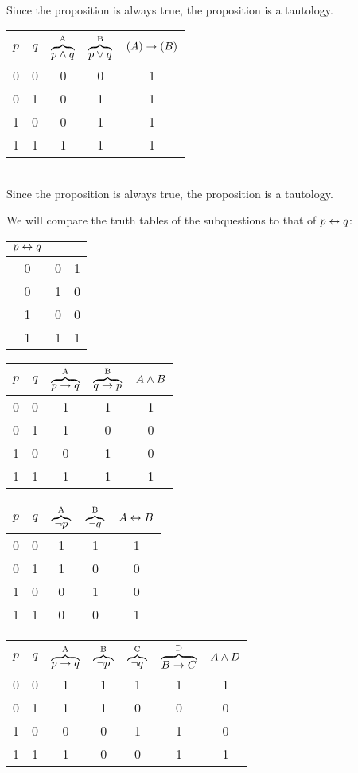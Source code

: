 \begin{solutions}
\hfill\\
Since the proposition is always true, the proposition is a tautology. 
\spart
\begin{tabular}{cc | ccc}
	\toprule
	$p$& $q$& 
	$\overbrace{p\wedge q}^\text{A}$ &
	$\overbrace{p\vee q}^\text{B}$ &
	$(A)\rightarrow (B)$\\
	\midrule
	\strut 
	0& 0&  0& 0& 1\\
	0& 1&  0& 1& 1\\
	1& 0&  0& 1& 1\\
	1& 1&  1& 1& 1\\
	\bottomrule
\end{tabular}

\hfill\\
Since the proposition is always true, the proposition is a tautology.

\setcounter{solutioncounter}{2}
\solution
We will compare the truth tables of the subquestions to that of $p \leftrightarrow q$: 
\begin{tabular}{cc | c}
	\toprule
	$p \leftrightarrow q$\\
	\midrule
	\strut
	0& 0& 1\\
	0& 1& 0\\
	1& 0& 0\\
	1& 1& 1\\
	\bottomrule

\end{tabular}
\spart
\begin{tabular}{cc | ccc}
	\toprule
	$p$& $q$&
	$\overbrace{p \rightarrow q}^\text{A}$&
	$\overbrace{q \rightarrow p}^\text{B}$&
	$A \wedge B$\\
	\midrule
	\strut
	0& 0& 1& 1& 1\\
	0& 1& 1& 0& 0\\
	1& 0& 0& 1& 0\\
	1& 1& 1& 1& 1\\
	\bottomrule
\end{tabular}

\spart
\begin{tabular}{cc | ccc}
	\toprule
	$p$& $q$&
	$\overbrace{\lnot p}^\text{A}$&
	$\overbrace{\lnot q}^\text{B}$&
	$A \leftrightarrow B$\\
	\midrule
	\strut
	0& 0& 1& 1& 1\\
	0& 1& 1& 0& 0\\
	1& 0& 0& 1& 0\\
	1& 1& 0& 0& 1\\
	\bottomrule
\end{tabular}

\spart
\begin{tabular}{cc | ccccc}
	\toprule
	$p$& $q$&
	$\overbrace{p \rightarrow q}^\text{A}$&
	$\overbrace{\lnot p}^\text{B}$&
	$\overbrace{\lnot q}^\text{C}$&
	$\overbrace{B \rightarrow C}^\text{D}$&
	$A \wedge D$\\
	\midrule
	\strut
	0& 0& 1& 1& 1& 1& 1\\
	0& 1& 1& 1& 0& 0& 0\\
	1& 0& 0& 0& 1& 1& 0\\
	1& 1& 1& 0& 0& 1& 1\\
	\bottomrule
\end{tabular}


\end{solutions}
